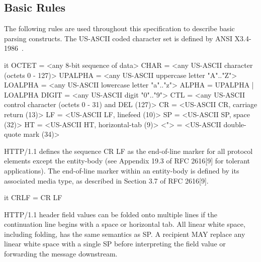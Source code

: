 \subsection{Basic Rules}

   The following rules are used throughout this specification to
   describe basic parsing constructs. The US-ASCII coded character set
   is defined by ANSI X3.4-1986~\cite{ANSI:US-ASCII}.

\begin{vcode}{it}
       OCTET          = <any 8-bit sequence of data>
       CHAR           = <any US-ASCII character (octets 0 - 127)>
       UPALPHA        = <any US-ASCII uppercase letter "A".."Z">
       LOALPHA        = <any US-ASCII lowercase letter "a".."z">
       ALPHA          = UPALPHA | LOALPHA
       DIGIT          = <any US-ASCII digit "0".."9">
       CTL            = <any US-ASCII control character
                        (octets 0 - 31) and DEL (127)>
       CR             = <US-ASCII CR, carriage return (13)>
       LF             = <US-ASCII LF, linefeed (10)>
       SP             = <US-ASCII SP, space (32)>
       HT             = <US-ASCII HT, horizontal-tab (9)>
       <">            = <US-ASCII double-quote mark (34)>
\end{vcode}

HTTP/1.1 defines the sequence CR LF as the end-of-line marker for all
protocol elements except the entity-body (see Appendix 19.3 of RFC
2616[9] for tolerant applications). The end-of-line marker within an
entity-body is defined by its associated media type, as described in
Section 3.7 of RFC 2616[9].


\begin{vcode}{it}
       CRLF           = CR LF
\end{vcode}

   HTTP/1.1 header field values can be folded onto multiple lines if the
   continuation line begins with a space or horizontal tab. All linear
   white space, including folding, has the same semantics as SP. A
   recipient MAY replace any linear white space with a single SP before
   interpreting the field value or forwarding the message downstream.


